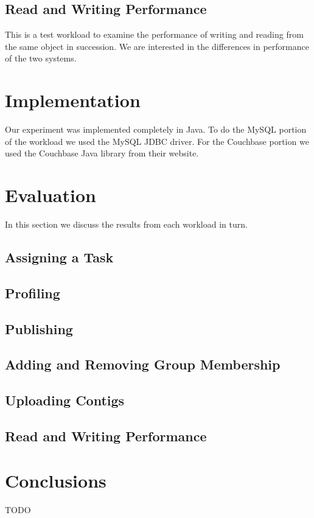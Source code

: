 \documentclass[]{IEEEtran}
\begin{document}
\subsection{Read and Writing Performance}
This is a test workload to examine the performance of writing and reading from the same object in succession. We are interested in the differences in performance of the two systems.

\section{Implementation}
Our experiment was implemented completely in Java. To do the MySQL portion of the workload we used
the MySQL JDBC driver. For the Couchbase portion we used the Couchbase Java library from their website.

\section{Evaluation}
In this section we discuss the results from each workload in turn.


\subsection{Assigning a Task}

\subsection{Profiling}

\subsection{Publishing}

\subsection{Adding and Removing Group Membership}

\subsection{Uploading Contigs}

\subsection{Read and Writing Performance}

\section{Conclusions}
TODO

% 
% 
\end{document}
